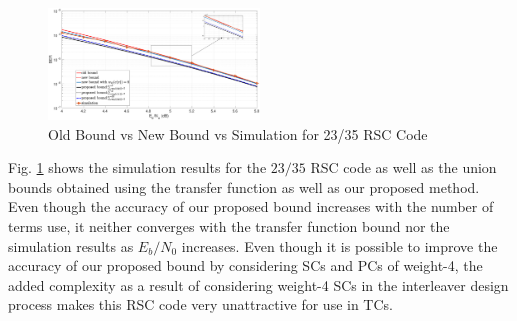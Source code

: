 \begin{figure}[htbp]
	\centering
	\includegraphics[width=0.5\textwidth]{./Images/RSC_23_35_lower_weights3.eps}
	\caption{Old Bound vs New Bound vs Simulation for 23/35 RSC Code}
	\label{simFig3}
\end{figure}
Fig. \ref{simFig3} shows the simulation results for the $23/35$ RSC code as well as the union bounds obtained using the transfer function as well as our proposed method. Even though the accuracy of our proposed bound increases with the number of terms use, it neither converges with the transfer function bound nor the simulation results as $E_b/N_0$ increases. Even though it is possible to improve the accuracy of our proposed bound by considering SCs and PCs of weight-4, the added complexity as a result of considering weight-4 SCs in the interleaver design process makes this RSC code very unattractive for use in TCs. 






